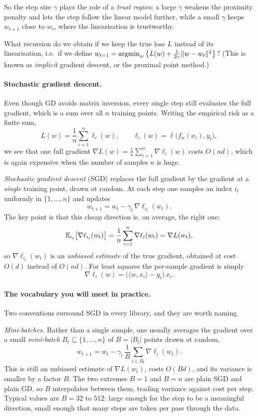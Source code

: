 So the step size $\gamma$ plays the role of a \emph{trust region}: a large $\gamma$
weakens the proximity penalty and lets the step follow the linear model further,
while a small $\gamma$ keeps $w_{t+1}$ close to $w_t$, where the linearisation is
trustworthy.

\begin{exercise}[$\star$]
What recursion do we obtain if we keep the true loss $L$ instead of its
linearisation, i.e.\ if we define $w_{t+1} = \operatorname*{argmin}_{w} \big\{ L(w) +
\tfrac{1}{2\gamma}\Vert w - w_t \Vert^2 \big\}$? (This is known as \emph{implicit}
gradient descent, or the proximal point method.)
\end{exercise}

\paragraph{Stochastic gradient descent.}
Even though GD avoids matrix inversion, every single step still evaluates the full
gradient, which is a sum over all $n$ training points. Writing the empirical risk
as a finite sum,
\[
L(w) = \frac{1}{n} \sum_{i=1}^n \ell_i(w), \qquad
\ell_i(w) = \ell\big( f_w(x_i), y_i \big),
\]
we see that one full gradient $\nabla L(w) = \frac1n \sum_{i=1}^n \nabla \ell_i(w)$
costs $O(n d)$, which is again expensive when the number of samples $n$ is huge.

\emph{Stochastic gradient descent} (SGD) replaces the full gradient by the
gradient at a \emph{single} training point, drawn at random. At each step one
samples an index $i_t$ uniformly in $\{1, \dots, n\}$ and updates
\[
w_{t+1} = w_t - \gamma_t\, \nabla \ell_{i_t}(w_t).
\]
The key point is that this cheap direction is, on average, the right one:
\[
\mathbb{E}_{i_t}\big[ \nabla \ell_{i_t}(w_t) \big]
   = \frac{1}{n} \sum_{i=1}^n \nabla \ell_i(w_t) = \nabla L(w_t),
\]
so $\nabla \ell_{i_t}(w_t)$ is an \emph{unbiased estimate} of the true gradient,
obtained at cost $O(d)$ instead of $O(n d)$. For least squares the per-sample
gradient is simply
\[
\nabla \ell_i(w) = \big( \langle w, x_i \rangle - y_i \big)\, x_i .
\]

\paragraph{The vocabulary you will meet in practice.}
Two conventions surround SGD in every library, and they are worth naming.

\emph{Mini-batches.} Rather than a single sample, one usually averages the gradient
over a small \emph{mini-batch} $B_t \subseteq \{1, \dots, n\}$ of $B = |B_t|$ points
drawn at random,
\[
w_{t+1} = w_t - \gamma_t \, \frac{1}{B} \sum_{i \in B_t} \nabla \ell_i(w_t) .
\]
This is still an unbiased estimate of $\nabla L(w_t)$, costs $O(Bd)$, and its variance
is smaller by a factor $B$. The two extremes $B = 1$ and $B = n$ are plain SGD and
plain GD, so $B$ interpolates between them, trading variance against cost per step.
Typical values are $B = 32$ to $512$: large enough for the step to be a meaningful
direction, small enough that many steps are taken per pass through the data.

